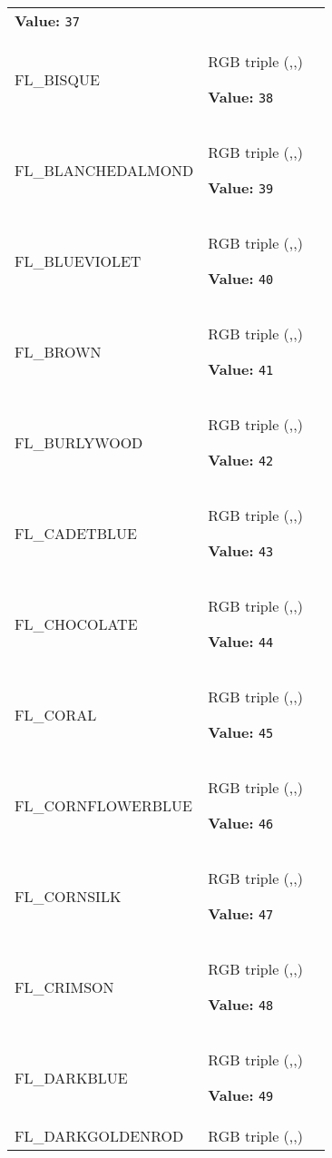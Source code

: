 \begin{longtable}{|p{\varnamewidth}|p{\vardescrwidth}|l}
\textbf{Value:} 
{\tt 37}&\\
\cline{1-2}
\raggedright F\-L\-\_\-B\-I\-S\-Q\-U\-E\- & \raggedright RGB triple (,,)

\textbf{Value:} 
{\tt 38}&\\
\cline{1-2}
\raggedright F\-L\-\_\-B\-L\-A\-N\-C\-H\-E\-D\-A\-L\-M\-O\-N\-D\- & \raggedright RGB triple (,,)

\textbf{Value:} 
{\tt 39}&\\
\cline{1-2}
\raggedright F\-L\-\_\-B\-L\-U\-E\-V\-I\-O\-L\-E\-T\- & \raggedright RGB triple (,,)

\textbf{Value:} 
{\tt 40}&\\
\cline{1-2}
\raggedright F\-L\-\_\-B\-R\-O\-W\-N\- & \raggedright RGB triple (,,)

\textbf{Value:} 
{\tt 41}&\\
\cline{1-2}
\raggedright F\-L\-\_\-B\-U\-R\-L\-Y\-W\-O\-O\-D\- & \raggedright RGB triple (,,)

\textbf{Value:} 
{\tt 42}&\\
\cline{1-2}
\raggedright F\-L\-\_\-C\-A\-D\-E\-T\-B\-L\-U\-E\- & \raggedright RGB triple (,,)

\textbf{Value:} 
{\tt 43}&\\
\cline{1-2}
\raggedright F\-L\-\_\-C\-H\-O\-C\-O\-L\-A\-T\-E\- & \raggedright RGB triple (,,)

\textbf{Value:} 
{\tt 44}&\\
\cline{1-2}
\raggedright F\-L\-\_\-C\-O\-R\-A\-L\- & \raggedright RGB triple (,,)

\textbf{Value:} 
{\tt 45}&\\
\cline{1-2}
\raggedright F\-L\-\_\-C\-O\-R\-N\-F\-L\-O\-W\-E\-R\-B\-L\-U\-E\- & \raggedright RGB triple (,,)

\textbf{Value:} 
{\tt 46}&\\
\cline{1-2}
\raggedright F\-L\-\_\-C\-O\-R\-N\-S\-I\-L\-K\- & \raggedright RGB triple (,,)

\textbf{Value:} 
{\tt 47}&\\
\cline{1-2}
\raggedright F\-L\-\_\-C\-R\-I\-M\-S\-O\-N\- & \raggedright RGB triple (,,)

\textbf{Value:} 
{\tt 48}&\\
\cline{1-2}
\raggedright F\-L\-\_\-D\-A\-R\-K\-B\-L\-U\-E\- & \raggedright RGB triple (,,)

\textbf{Value:} 
{\tt 49}&\\
\cline{1-2}
\raggedright F\-L\-\_\-D\-A\-R\-K\-G\-O\-L\-D\-E\-N\-R\-O\-D\- & \raggedright RGB triple (,,)


\end{longtable}
